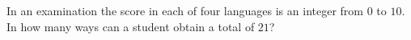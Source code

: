 In an examination the score in each of four languages is an integer from $0$ to $10$. In how many ways can a student obtain a total of $21$?
